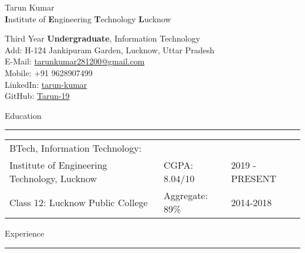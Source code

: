 \documentclass[10pt, hidelinks]{article}
\begin{document}

	\begin{minipage}[t]{0.46\textwidth}
		{\Huge\color{RoyalBlue}Tarun Kumar}\\
		{\Large\textbf{I}nstitute of \textbf{E}ngineering \textbf{T}echnology \textbf{L}ucknow}
	\end{minipage}
	\begin{minipage}[t]{0.54\textwidth}
		\begin{flushright}
			{\small
			Third Year \textbf{Undergraduate}, {\color{RoyalBlue}Information Technology\\}
			{\color{RoyalBlue}Add: }{H-124 Jankipuram Garden, Lucknow, Uttar Pradesh\\}
			{\color{RoyalBlue}E-Mail: }{\href{mailto:tarunkumar281200@gmail.com}{tarunkumar281200@gmail.com}\\}
			{\color{RoyalBlue}Mobile: }{+91 9628907499\\}
			{\color{RoyalBlue}LinkedIn: }{\href{https://www.linkedin.com/in/tarun-kumar-7489651a0/}{tarun-kumar}\\}
			{\color{RoyalBlue}GitHub: }{\href{https://github.com/Tarun-19}{Tarun-19}\\}
			}
		\end{flushright}
	\end{minipage}


	{\large\color{RoyalBlue}Education}
	\par\noindent\rule[7pt]{\textwidth}{0.1pt}
	\begin{center}
		{\small \vspace*{-5mm}
		\begin{tabular}{ m{} m{} m{}}
			BTech, Information Technology:\\ Institute of Engineering Technology, Lucknow & CGPA: 8.04/10 & 2019 - PRESENT \\
			Class 12: Lucknow Public College & Aggregate: 89\% & 2014-2018 \\
		\end{tabular}
		}
	\end{center}


	{\large\color{RoyalBlue}Experience}
	\par\noindent\rule[7pt]{\textwidth}{0.1pt}
\end{document}
